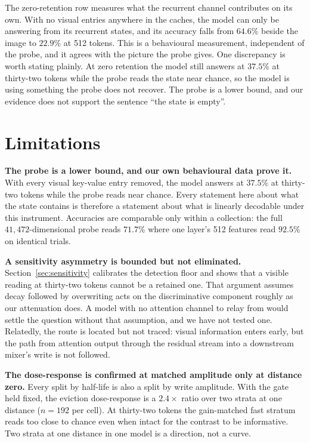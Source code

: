 \documentclass{article}
\begin{document}
The zero-retention row measures what the recurrent channel contributes on its
own. With no visual entries anywhere in the caches, the model can only be
answering from its recurrent states, and its accuracy falls from $64.6\%$
beside the image to $22.9\%$ at 512 tokens. This is a behavioural measurement,
independent of the probe, and it agrees with the picture the probe gives. One
discrepancy is worth stating plainly. At zero retention the model still
answers at $37.5\%$ at thirty-two tokens while the probe reads the state near
chance, so the model is using something the probe does not recover. The probe
is a lower bound, and our evidence does not support the sentence ``the state
is empty''.

\section{Limitations}

\textbf{The probe is a lower bound, and our own behavioural data prove it.}
With every visual key-value entry removed, the model answers at $37.5\%$ at
thirty-two tokens while the probe reads near chance. Every statement here
about what the state contains is therefore a statement about what is linearly
decodable under this instrument. Accuracies are comparable only within a
collection: the full $41{,}472$-dimensional probe reads $71.7\%$ where one
layer's 512 features read $92.5\%$ on identical trials.

\textbf{A sensitivity asymmetry is bounded but not eliminated.}
Section~\ref{sec:sensitivity} calibrates the detection floor and shows that a
visible reading at thirty-two tokens cannot be a retained one. That argument
assumes decay followed by overwriting acts on the discriminative component
roughly as our attenuation does. A model with no attention channel to relay
from would settle the question without that assumption, and we have not tested
one. Relatedly, the route is located but not traced: visual information enters
early, but the path from attention output through the residual stream into a
downstream mixer's write is not followed.

\textbf{The dose-response is confirmed at matched amplitude only at distance
zero.} Every split by half-life is also a split by write amplitude. With the
gate held fixed, the eviction dose-response is a $2.4\times$ ratio over two
strata at one distance ($n = 192$ per cell). At thirty-two tokens the
gain-matched fast stratum reads too close to chance even when intact for the
contrast to be informative. Two strata at one distance in one model is a
direction, not a curve.
\end{document}
